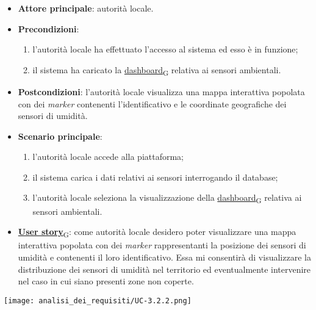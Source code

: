 \newpage
{}
\begin{itemize}
	\item \textbf{Attore principale}: autorità locale.
	\item \textbf{Precondizioni}:
	      \begin{enumerate}
		      \item l'autorità locale ha effettuato l'accesso al sistema ed esso è in funzione;
		      \item il sistema ha caricato la \href{https://7last.github.io/docs/pb/documentazione-interna/glossario\#dashboard}{dashboard\textsubscript{G}} relativa ai sensori ambientali.
	      \end{enumerate}
	\item \textbf{Postcondizioni}: l'autorità locale visualizza una mappa interattiva popolata con dei \textit{marker} contenenti l'identificativo e le coordinate geografiche dei sensori di umidità.
	\item \textbf{Scenario principale}:
	      \begin{enumerate}
		      \item l'autorità locale accede alla piattaforma;
		      \item il sistema carica i dati relativi ai sensori interrogando il database;
		      \item l'autorità locale seleziona la visualizzazione della \href{https://7last.github.io/docs/pb/documentazione-interna/glossario\#dashboard}{dashboard\textsubscript{G}} relativa ai sensori ambientali.
	      \end{enumerate}
	\item \href{https://7last.github.io/docs/pb/documentazione-interna/glossario\#user-story}{\textbf{User story}\textsubscript{G}}:
	      come autorità locale desidero poter visualizzare una mappa interattiva popolata con dei \textit{marker} rappresentanti la posizione dei sensori di umidità
	      e contenenti il loro identificativo. Essa mi consentirà di visualizzare la distribuzione dei sensori di umidità nel territorio ed eventualmente intervenire nel caso in cui siano presenti zone non coperte.
\end{itemize}
\begin{center}
	\texttt{[image: analisi\_dei\_requisiti/UC-3.2.2.png]}
\end{center}

